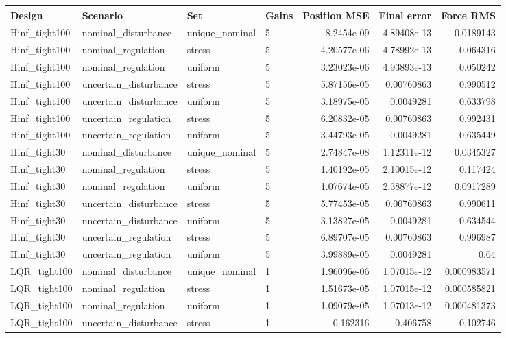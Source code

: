 \begin{tabular}{llllrrr}
\hline
Design & Scenario & Set & Gains & Position MSE & Final error & Force RMS \\
\hline
Hinf\_tight100 & nominal\_disturbance & unique\_nominal & 5 & 8.2454e-09 & 4.89408e-13 & 0.0189143 \\
Hinf\_tight100 & nominal\_regulation & stress & 5 & 4.20577e-06 & 4.78992e-13 & 0.064316 \\
Hinf\_tight100 & nominal\_regulation & uniform & 5 & 3.23023e-06 & 4.93893e-13 & 0.050242 \\
Hinf\_tight100 & uncertain\_disturbance & stress & 5 & 5.87156e-05 & 0.00760863 & 0.990512 \\
Hinf\_tight100 & uncertain\_disturbance & uniform & 5 & 3.18975e-05 & 0.0049281 & 0.633798 \\
Hinf\_tight100 & uncertain\_regulation & stress & 5 & 6.20832e-05 & 0.00760863 & 0.992431 \\
Hinf\_tight100 & uncertain\_regulation & uniform & 5 & 3.44793e-05 & 0.0049281 & 0.635449 \\
Hinf\_tight30 & nominal\_disturbance & unique\_nominal & 5 & 2.74847e-08 & 1.12311e-12 & 0.0345327 \\
Hinf\_tight30 & nominal\_regulation & stress & 5 & 1.40192e-05 & 2.10015e-12 & 0.117424 \\
Hinf\_tight30 & nominal\_regulation & uniform & 5 & 1.07674e-05 & 2.38877e-12 & 0.0917289 \\
Hinf\_tight30 & uncertain\_disturbance & stress & 5 & 5.77453e-05 & 0.00760863 & 0.990611 \\
Hinf\_tight30 & uncertain\_disturbance & uniform & 5 & 3.13827e-05 & 0.0049281 & 0.634544 \\
Hinf\_tight30 & uncertain\_regulation & stress & 5 & 6.89707e-05 & 0.00760863 & 0.996987 \\
Hinf\_tight30 & uncertain\_regulation & uniform & 5 & 3.99889e-05 & 0.0049281 & 0.64 \\
LQR\_tight100 & nominal\_disturbance & unique\_nominal & 1 & 1.96096e-06 & 1.07015e-12 & 0.000983571 \\
LQR\_tight100 & nominal\_regulation & stress & 1 & 1.51673e-05 & 1.07015e-12 & 0.000585821 \\
LQR\_tight100 & nominal\_regulation & uniform & 1 & 1.09079e-05 & 1.07013e-12 & 0.000481373 \\
LQR\_tight100 & uncertain\_disturbance & stress & 1 & 0.162316 & 0.406758 & 0.102746 \\

\end{tabular}
